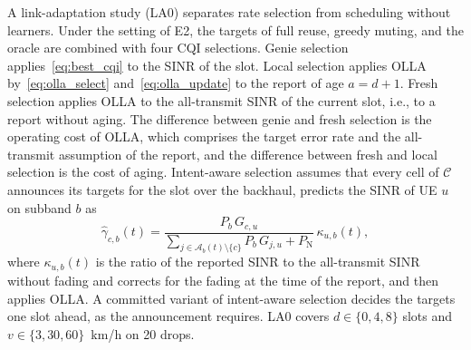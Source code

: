 \documentclass{ieeeaccess}
\begin{document}
A link-adaptation study (LA0) separates rate selection from scheduling without learners. Under the setting of E2, the targets of full reuse, greedy muting, and the oracle are combined with four CQI selections. Genie selection applies~\eqref{eq:best_cqi} to the SINR of the slot. Local selection applies OLLA by~\eqref{eq:olla_select} and~\eqref{eq:olla_update} to the report of age $a = d + 1$. Fresh selection applies OLLA to the all-transmit SINR of the current slot, i.e., to a report without aging. The difference between genie and fresh selection is the operating cost of OLLA, which comprises the target error rate and the all-transmit assumption of the report, and the difference between fresh and local selection is the cost of aging. Intent-aware selection assumes that every cell of $\mathcal{C}$ announces its targets for the slot over the backhaul, predicts the SINR of UE $u$ on subband $b$ as
\begin{equation}
\hat{\gamma}_{c,b}(t) = \frac{P_b\, G_{c,u}}{\sum_{j \in \mathcal{A}_b(t) \setminus \{c\}} P_b\, G_{j,u} + P_{\text{N}}}\, \kappa_{u,b}(t),
\label{eq:intent_sinr}
\end{equation}
where $\kappa_{u,b}(t)$ is the ratio of the reported SINR to the all-transmit SINR without fading and corrects for the fading at the time of the report, and then applies OLLA. A committed variant of intent-aware selection decides the targets one slot ahead, as the announcement requires. LA0 covers $d \in \{0, 4, 8\}$ slots and $v \in \{3, 30, 60\}$~km/h on 20 drops.
\end{document}

